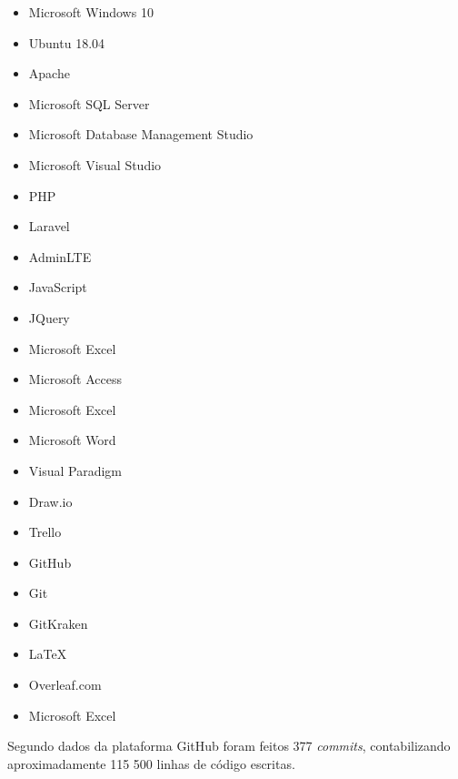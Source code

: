 \begin{multicols}{3}
	\begin{itemize}
		\item Microsoft Windows 10
		\item Ubuntu 18.04
		
		\item Apache
		\item Microsoft SQL Server
		
		\item Microsoft Database Management Studio
		\item Microsoft Visual Studio
		
		\item PHP
		\item Laravel
		\item AdminLTE
		\item JavaScript
		\item JQuery
		
		\item Microsoft Excel
		\item Microsoft Access
		\item Microsoft Excel
		\item Microsoft Word
		
		\item Visual Paradigm
		\item Draw.io
		
		\item Trello
		\item GitHub
		\item Git
		\item GitKraken
		
		\item \LaTeX
		\item Overleaf.com
		\item Microsoft Excel
	\end{itemize}
\end{multicols}

Segundo dados da plataforma GitHub foram feitos 377 \textit{commits}, contabilizando aproximadamente 115 500 linhas de código escritas.